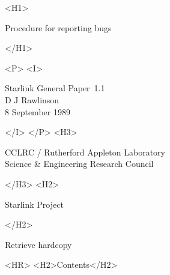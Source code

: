 \documentclass[twoside,11pt]{article}
\newcommand{\stardoccategory}  {Starlink General Paper}
\newcommand{\stardocnumber}    {1.1}
\newcommand{\stardocauthors}   {D J Rawlinson}
\newcommand{\stardocdate}      {8 September 1989}
\newcommand{\stardoctitle}     {Procedure for reporting bugs}
\newcommand{\htmladdnormallink}[2]{#1}
\newcommand{\htmladdimg}[1]{}
\newcommand{\htmlref}[2]{#1}
\newcommand{\htmladdtonavigation}[1]{}
\newcommand{\xlabel}[1]{}
\begin{document}
\begin{htmlonly}
   \xlabel{}
   \begin{rawhtml} <H1> \end{rawhtml}
      \stardoctitle
   \begin{rawhtml} </H1> \end{rawhtml}


   \begin{rawhtml} <P> <I> \end{rawhtml}
   \stardoccategory\ \stardocnumber \\
   \stardocauthors \\
   \stardocdate
   \begin{rawhtml} </I> </P> <H3> \end{rawhtml}
      \htmladdnormallink{CCLRC}{http://www.cclrc.ac.uk} /
      \htmladdnormallink{Rutherford Appleton Laboratory}
                        {http://www.cclrc.ac.uk/ral} \\
      \htmladdnormallink{Science \& Engineering Research Council}
                        {http://www.pparc.ac.uk} \\
   \begin{rawhtml} </H3> <H2> \end{rawhtml}
      \htmladdnormallink{Starlink Project}{http://www.starlink.ac.uk/}
   \begin{rawhtml} </H2> \end{rawhtml}
   \htmladdnormallink{\htmladdimg{source.gif} Retrieve hardcopy}
      {http://www.starlink.ac.uk/cgi-bin/hcserver?\stardocsource}\\

  \label{stardoccontents}
  \begin{rawhtml}
    <HR>
    <H2>Contents</H2>
  \end{rawhtml}
  \htmladdtonavigation{\htmlref{\htmladdimg{contents_motif.gif}}
        {stardoccontents}}


\end{htmlonly}
\end{document}
